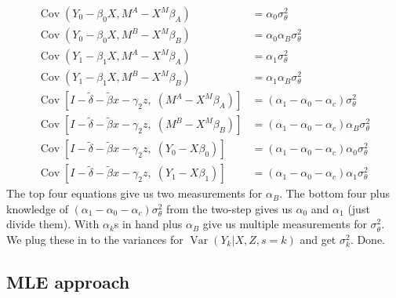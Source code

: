 \documentclass[11pt,letterpaper]{article}
\DeclareMathOperator{\Var}{Var}
\DeclareMathOperator{\Cov}{Cov}
\begin{document}
\begin{align}
\Cov(Y_0 - \beta_0 X, M^A - X^M\beta_A) &= \alpha_0 \sigma^2_\theta \\
\Cov(Y_0 - \beta_0 X, M^B - X^M\beta_B) &= \alpha_0 \alpha_B \sigma^2_\theta \\
\Cov(Y_1 - \beta_1 X, M^A - X^M\beta_A) &= \alpha_1 \sigma^2_\theta \\
\Cov(Y_1 - \beta_1 X, M^B - X^M\beta_B) &= \alpha_1 \alpha_B \sigma^2_\theta \\
\Cov\left[I - \widetilde \delta - \widetilde \beta x -\gamma_2 z,\; \left(M^A - X^M\beta_A \right)\right]
	&= (\alpha_1 - \alpha_0 - \alpha_c) \sigma^2_\theta \\
\Cov\left[I - \widetilde \delta - \widetilde \beta x -\gamma_2 z,\; \left(M^B - X^M\beta_B \right)\right]
	&= (\alpha_1 - \alpha_0 - \alpha_c) \alpha_B \sigma^2_\theta \\
\Cov\left[I - \widetilde \delta - \widetilde \beta x -\gamma_2 z,\; \left(Y_0 - X\beta_0 \right)\right] 
	&= (\alpha_1 - \alpha_0 - \alpha_c) \alpha_0\sigma^2_\theta \\
\Cov\left[I - \widetilde \delta - \widetilde \beta x -\gamma_2 z,\; \left(Y_1 - X\beta_1 \right)\right] 
	&= (\alpha_1 - \alpha_0 - \alpha_c) \alpha_1 \sigma^2_\theta
\end{align}
The top four equations give us two measurements for $\alpha_B$. The bottom four plus knowledge of $(\alpha_1 - \alpha_0 - \alpha_c)\sigma^2_\theta$ from the two-step gives us $\alpha_0$ and $\alpha_1$ (just divide them). With $\alpha_k$s in hand plus $\alpha_B$ give us multiple measurements for $\sigma^2_\theta$. We plug these in to the variances for $\Var(Y_k|X,Z,s=k)$ and get $\sigma_k^2$. Done.

\subsection{MLE approach}
\end{document}
